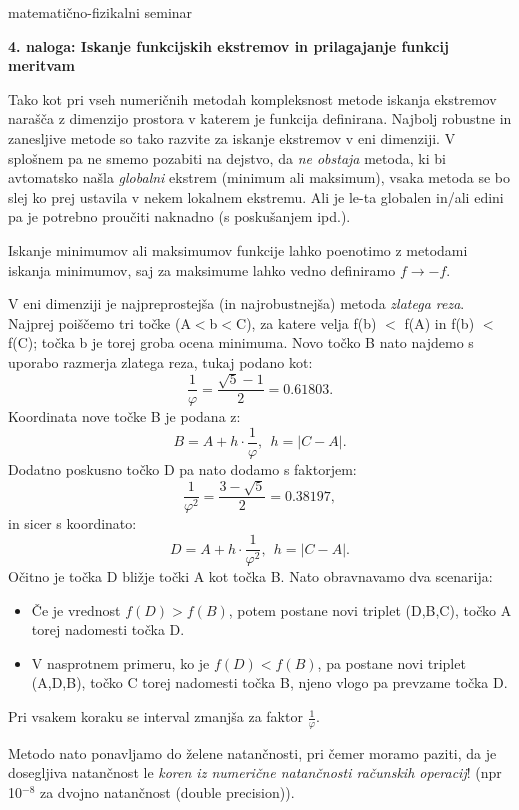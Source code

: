 \documentclass[12pt]{article}
\begin{document}
\thispagestyle{empty}


\setcounter{equation}{0}
\centerline{\sc matematično-fizikalni seminar~\thisyear}
\bigskip
\setcounter{equation}{0}

\centerline{\bf 4. naloga: Iskanje funkcijskih ekstremov in prilagajanje funkcij meritvam}
\bigskip
\bigskip

Tako kot pri vseh numeričnih metodah kompleksnost metode iskanja
ekstremov narašča z dimenzijo prostora v katerem je funkcija
definirana. Najbolj robustne in zanesljive metode so tako razvite za
iskanje ekstremov v eni dimenziji. V splošnem pa ne smemo pozabiti
na dejstvo, da \emph{ne obstaja} metoda, ki bi avtomatsko našla
\emph{globalni} ekstrem (minimum ali maksimum), vsaka metoda se bo
slej ko prej ustavila v nekem lokalnem ekstremu. Ali je le-ta globalen
in/ali edini pa je potrebno proučiti naknadno (s poskušanjem
ipd.).

Iskanje minimumov ali maksimumov funkcije lahko poenotimo z metodami
iskanja minimumov, saj za maksimume lahko vedno definiramo $f \to -f$.

V eni dimenziji je najpreprostejša (in najrobustnejša) metoda
\emph{zlatega reza}. Najprej poiščemo tri točke (A$<$b$<$C), za
katere velja f(b) $<$ f(A) in f(b) $<$ f(C); točka b je torej groba ocena
minimuma. Novo točko B nato najdemo s uporabo razmerja zlatega reza, tukaj podano kot:
$$ \frac{1}{\varphi} = \frac{\sqrt{5}-1}{2} = 0.61803. $$
Koordinata nove točke B je podana z:
$$ B = A + h \cdot \frac{1}{\varphi}, ~~ h=|C-A|.$$
Dodatno poskusno točko D pa nato dodamo s faktorjem:
$$ \frac{1}{\varphi^2} = \frac{3 - \sqrt{5}}{2} = 0.38197, $$
in sicer s koordinato:
$$ D = A + h \cdot \frac{1}{\varphi^2}, ~~ h=|C-A|.$$
Očitno je točka D bližje točki A kot točka B. Nato obravnavamo dva scenarija:
\begin{itemize}
\item Če je vrednost $f(D) > f (B)$, potem postane novi triplet (D,B,C), točko A torej nadomesti točka D.
\item V nasprotnem primeru, ko je  $f(D) < f (B)$, pa postane novi triplet (A,D,B), točko C torej nadomesti točka B, njeno vlogo
pa prevzame točka D.
\end{itemize}
Pri vsakem koraku se interval zmanjša za faktor $\frac{1}{\varphi}$. 

Metodo nato ponavljamo do želene natančnosti, pri čemer
moramo paziti, da je dosegljiva natančnost le \emph{koren iz
  numerične natančnosti računskih operacij}! (npr 10$^{-8}$ za
dvojno natančnost (double precision)).
\end{document}
